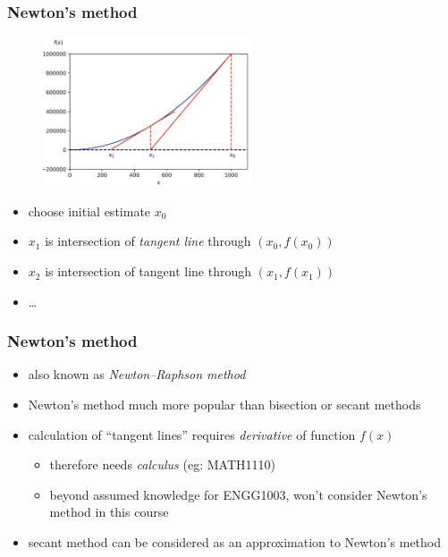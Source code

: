 \documentclass[english,14pt]{beamer}
\newcommand\red[1]{{\color{red} #1}}
\begin{document}

\begin{frame}[fragile]

\frametitle{Newton's method}

\vspace*{-6mm}
\begin{figure}[ht]
	\centering
	\includegraphics[width=0.55\textwidth]{figures/NewtonsMethod}
\end{figure}
\vspace*{-7mm}
\begin{itemize}
	\item choose initial estimate $x_0$
	\item $x_1$ is intersection of \emph{\red{tangent line}} through $(x_0,f(x_0))$
	\item $x_2$ is intersection of tangent line through $(x_1,f(x_1))$
	\item[] \ldots
\end{itemize}

\end{frame}


\begin{frame}[fragile]

\frametitle{Newton's method}

\begin{itemize}
	\item also known as \emph{Newton--Raphson method}
	\item Newton's method much more popular than bisection or secant methods
	\item calculation of ``tangent lines'' requires \emph{\red{derivative}} of function $f(x)$
	\begin{itemize}
		\item therefore needs \emph{calculus} (eg: MATH1110)
		\item beyond assumed knowledge for ENGG1003, won't consider Newton's method in this course
	\end{itemize}
	\item secant method can be considered as an approximation to Newton's method
\end{itemize}

\end{frame}
\end{document}
